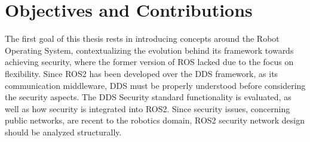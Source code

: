 


\section{Objectives and Contributions}

The first goal of this thesis rests in introducing concepts around the Robot Operating System, contextualizing the evolution behind its framework towards achieving security, where the former version of ROS lacked due to the focus on flexibility. Since ROS2 has been developed over the DDS framework, as its communication middleware, DDS must be properly understood before considering the security aspects. %
The DDS Security standard functionality is evaluated, as well as how security is integrated into ROS2. Since security issues, concerning public networks, are recent to the robotics domain, ROS2 security network design should be analyzed structurally.

